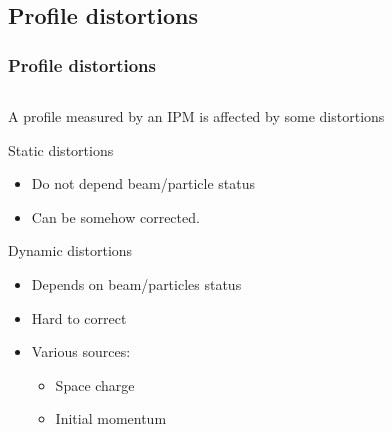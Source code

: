 \subsection{Profile distortions}
\begin{frame}[t]
  \frametitle{Profile distortions}
  \begin{columns}
    \begin{column}{0.45\textwidth}
      A profile measured by an IPM is affected by some distortions
      \begin{block}{Static distortions}
        \begin{itemize}
          \item Do not depend beam/particle status
          \item Can be somehow corrected.
        \end{itemize}
      \end{block}
      \begin{block}{Dynamic distortions}
        \begin{itemize}
          \item Depends on beam/particles status
          \item Hard to correct
          \item Various sources:
                \begin{itemize}
                  \item Space charge
                  \item Initial momentum
                \end{itemize}
        \end{itemize}
      \end{block}
    \end{column}
    \begin{column}{0.45\textwidth}

\end{column}
\end{columns}
\end{frame}
